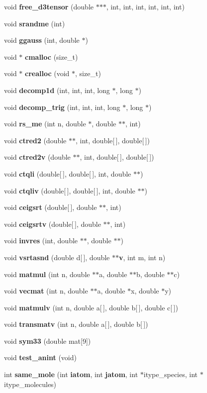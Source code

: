 \begin{CompactItemize}
\item 
void {\bf free\_\-d3tensor} (double $\ast$$\ast$$\ast$, int, int, int, int, int, int)
\item 
void {\bf srandme} (int)
\item 
void {\bf ggauss} (int, double $\ast$)
\item 
void $\ast$ {\bf cmalloc} (size\_\-t)
\item 
void $\ast$ {\bf crealloc} (void $\ast$, size\_\-t)
\item 
void {\bf decomp1d} (int, int, int, long $\ast$, long $\ast$)
\item 
void {\bf decomp\_\-trig} (int, int, int, long $\ast$, long $\ast$)
\item 
void {\bf rs\_\-me} (int n, double $\ast$, double $\ast$$\ast$, int)
\item 
void {\bf ctred2} (double $\ast$$\ast$, int, double[$\,$], double[$\,$])
\item 
void {\bf ctred2v} (double $\ast$$\ast$, int, double[$\,$], double[$\,$])
\item 
void {\bf ctqli} (double[$\,$], double[$\,$], int, double $\ast$$\ast$)
\item 
void {\bf ctqliv} (double[$\,$], double[$\,$], int, double $\ast$$\ast$)
\item 
void {\bf ceigsrt} (double[$\,$], double $\ast$$\ast$, int)
\item 
void {\bf ceigsrtv} (double[$\,$], double $\ast$$\ast$, int)
\item 
void {\bf invres} (int, double $\ast$$\ast$, double $\ast$$\ast$)
\item 
void {\bf vsrtasnd} (double d[$\,$], double $\ast$$\ast${\bf v}, int m, int n)
\item 
void {\bf matmul} (int n, double $\ast$$\ast$a, double $\ast$$\ast$b, double $\ast$$\ast$c)
\item 
void {\bf vecmat} (int n, double $\ast$$\ast$a, double $\ast$x, double $\ast$y)
\item 
void {\bf matmulv} (int n, double a[$\,$], double b[$\,$], double c[$\,$])
\item 
void {\bf transmatv} (int n, double a[$\,$], double b[$\,$])
\item 
void {\bf sym33} (double mat[9])
\item 
void {\bf test\_\-anint} (void)
\item 
int {\bf same\_\-mole} (int {\bf iatom}, int {\bf jatom}, int $\ast$itype\_\-species, int $\ast$itype\_\-molecules)
\item 

\end{CompactItemize}
